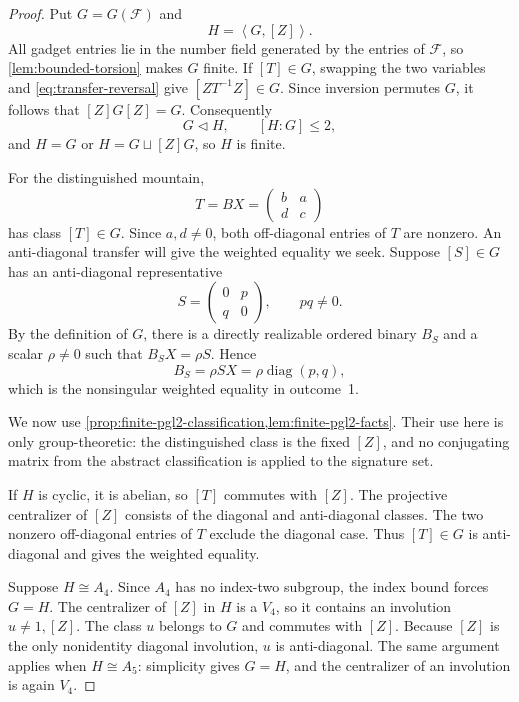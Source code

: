 \documentclass[11pt,letterpaper,onecolumn]{article}
\theoremstyle{plain}
\theoremstyle{definition}
\theoremstyle{remark}
\newcommand{\cF}{\mathcal F}
\newcommand{\angles}[1]{\left\langle #1\right\rangle}
\newcommand{\diag}{\operatorname{diag}}
\begin{document}
	\begin{proof}
		Put \(G=G(\cF)\) and
		\[
		H=\angles{G,[Z]}.
		\]
		All gadget entries lie in the number field generated by the entries of
		\(\cF\), so \cref{lem:bounded-torsion} makes \(G\) finite.  If
		\([T]\in G\), swapping the two variables and \cref{eq:transfer-reversal} give
		\([ZT^{-1}Z]\in G\).  Since inversion permutes \(G\), it follows that
		\([Z]G[Z]=G\).  Consequently
		\[
		G\triangleleft H,\qquad [H:G]\le2,
		\]
		and \(H=G\) or \(H=G\sqcup[Z]G\), so \(H\) is finite.
		
		For the distinguished mountain,
		\[
		T=BX=\begin{pmatrix}b&a\\d&c\end{pmatrix}
		\]
		has class \([T]\in G\).  Since \(a,d\ne0\), both off-diagonal entries of
		\(T\) are nonzero.  An anti-diagonal transfer will give the weighted equality we seek. Suppose \([S]\in G\)
		has an anti-diagonal representative
		\[
		S=\begin{pmatrix}0&p\\q&0\end{pmatrix},
		\qquad pq\ne0.
		\]
		By the definition of \(G\), there is a directly realizable ordered binary
		\(B_S\) and a scalar \(\rho\ne0\) such that \(B_SX=\rho S\).  Hence
		\[
		B_S=\rho SX=\rho\diag(p,q),
		\]
		which is the nonsingular weighted equality in outcome~1.
		
		We now use
		\cref{prop:finite-pgl2-classification,lem:finite-pgl2-facts}.  Their use
		here is only group-theoretic: the distinguished class is the fixed
		\([Z]\), and no conjugating matrix from the abstract classification is
		applied to the signature set.
		
		If \(H\) is cyclic, it is abelian, so \([T]\) commutes with \([Z]\).  The
		projective centralizer of \([Z]\) consists of the diagonal and
		anti-diagonal classes.  The two nonzero off-diagonal entries of \(T\)
		exclude the diagonal case. Thus \([T]\in G\) is anti-diagonal and gives the
		weighted equality.
		
		Suppose \(H\cong A_4\).  Since \(A_4\) has no index-two subgroup, the
		index bound forces \(G=H\).  The centralizer of \([Z]\) in \(H\) is a
		\(V_4\), so it contains an involution \(u\ne1,[Z]\).  The class \(u\)
		belongs to \(G\) and commutes with \([Z]\).  Because \([Z]\) is the only
		nonidentity diagonal involution, \(u\) is anti-diagonal.  The same argument
		applies when \(H\cong A_5\): simplicity gives \(G=H\), and the
		centralizer of an involution is again \(V_4\).
		

\end{proof}
\end{document}

